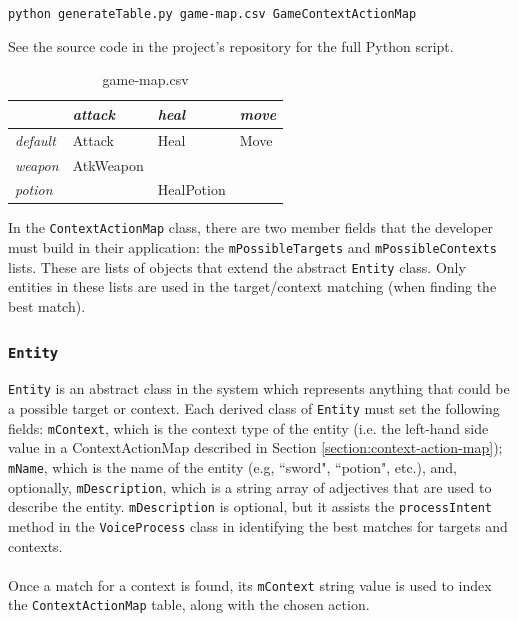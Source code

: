 \documentclass[11pt]{article}
\begin{document}
\begin{center}
\texttt{python generateTable.py game-map.csv GameContextActionMap}
\end{center}

See the source code in the project's repository for the full Python script.

\begin{table}[H]
\centering
\caption{game-map.csv}
\label{table:game-map-csv}
\begin{tabular}{l|l|l|l|}
\cline{1-4}
\multicolumn{1}{|l|}{\textbf{}} & \textit{attack}    & \textit{heal}  & \textit{move}    \\ \hline
\multicolumn{1}{|l|}{\textit{default}} & Attack    & Heal  & Move    \\ \hline
\multicolumn{1}{|l|}{\textit{weapon}}  & AtkWeapon &            &  \\ \hline
\multicolumn{1}{|l|}{\textit{potion}}  &                & HealPotion &              \\ \hline
\end{tabular}
\end{table}

In the \texttt{ContextActionMap} class, there are two member fields that the developer must build in their application: the \texttt{mPossibleTargets} and \texttt{mPossibleContexts} lists. These are lists of objects that extend the abstract \texttt{Entity} class. Only entities in these lists are used in the target/context matching (when finding the best match).

\subsubsection{\texttt{Entity}}
\label{section:entity}

\texttt{Entity} is an abstract class in the system which represents anything that could be a possible target or context. Each derived class of \texttt{Entity} must set the following fields: \texttt{mContext}, which is the context type of the entity (i.e. the left-hand side value in a ContextActionMap described in Section \ref{section:context-action-map}); \texttt{mName}, which is the name of the entity (e.g, ``sword", ``potion", etc.), and, optionally, \texttt{mDescription}, which is a string array of adjectives that are used to describe the entity. \texttt{mDescription} is optional, but it assists the \texttt{processIntent} method in the \texttt{VoiceProcess} class in identifying the best matches for targets and contexts.
\\
\\
Once a match for a context is found, its \texttt{mContext} string value is used to index the \texttt{ContextActionMap} table, along with the chosen action.
\end{document}
